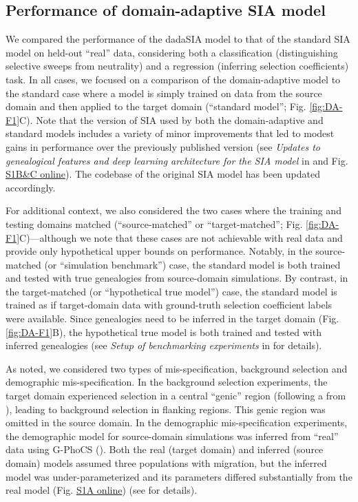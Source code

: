 \subsection{Performance of domain-adaptive \ac{SIA} model}
We compared the performance of the \acf{dadaSIA} model to that of the standard \ac{SIA} model on held-out “real” data, considering both a classification (distinguishing selective sweeps from neutrality) and a regression (inferring selection coefficients) task. In all cases, we focused on a comparison of the domain-adaptive model to the standard case where a model is simply trained on data from the source domain and then applied to the target domain (“standard model”; Fig. \ref{fig:DA-F1}C). Note that the version of \ac{SIA} used by both the domain-adaptive and standard models includes a variety of minor improvements that led to modest gains in performance over the previously published version (see \textit{Updates to genealogical features and deep learning architecture for the \ac{SIA} model} in  and Fig. \href{https://journals.plos.org/plosgenetics/article?id=10.1371/journal.pgen.1011032#sec018}{S1B\&C online}). The codebase of the original \ac{SIA} model has been updated accordingly.

For additional context, we also considered the two cases where the training and testing domains matched (“source-matched” or “target-matched”; Fig. \ref{fig:DA-F1}C)—although we note that these cases are not achievable with real data and provide only hypothetical upper bounds on performance. Notably, in the source-matched (or “simulation benchmark”) case, the standard model is both trained and tested with true genealogies from source-domain simulations. By contrast, in the target-matched (or “hypothetical true model”) case, the standard model is trained as if target-domain data with ground-truth selection coefficient labels were available. Since genealogies need to be inferred in the target domain (Fig. \ref{fig:DA-F1}B), the hypothetical true model is both trained and tested with inferred genealogies (see \textit{Setup of benchmarking experiments} in  for details).

As noted, we considered two types of mis-specification, background selection and demographic mis-specification. In the background selection experiments, the target domain experienced selection in a central “genic” region (following a  from \cite{boyko_assessing_2008}), leading to background selection in flanking regions. This genic region was omitted in the source domain. In the demographic mis-specification experiments, the demographic model for source-domain simulations was inferred from “real” data using G-PhoCS (\cite{gronau_bayesian_2011}). Both the real (target domain) and inferred (source domain) models assumed three populations with migration, but the inferred model was under-parameterized and its parameters differed substantially from the real model (Fig. \href{https://journals.plos.org/plosgenetics/article?id=10.1371/journal.pgen.1011032#sec018}{S1A online}) (see  for details).

